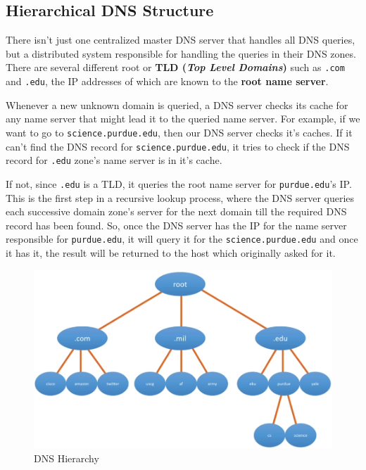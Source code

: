 \subsection{Hierarchical DNS Structure}
There isn't just one centralized master DNS server that handles all DNS queries, but a distributed system responsible for handling the queries in their DNS zones. There are several different root or \textbf{TLD (\textit{Top Level Domains})} such as \verb|.com| and \verb|.edu|, the IP addresses of which are known to the \textbf{root name server}. 

Whenever a new unknown domain is queried, a DNS server checks its cache for any name server that might lead it to the queried name server. For example, if we want to go to \verb|science.purdue.edu|, then our DNS server checks it's caches. If it can't find the DNS record for \verb|science.purdue.edu|, it tries to check if the DNS record for \verb|.edu| zone's name server is in it's cache. 

If not, since \verb|.edu| is a TLD, it queries the root name server for \verb|purdue.edu|'s IP. This is the first step in a recursive lookup process, where the DNS server queries each successive domain zone's server for the next domain till the required DNS record has been found. So, once the DNS server has the IP for the name server responsible for \verb|purdue.edu|, it will query it for the \verb|science.purdue.edu| and once it has it, the result will be returned to the host which originally asked for it. 

\begin{figure}[H]
	\centering
	\includegraphics[width=\linewidth]{"Mod1/chapters/1.1.g. Hierarchial DNS"}
	\caption{DNS Hierarchy}
	\label{fig:1 DNS Hierarchy}
\end{figure}


